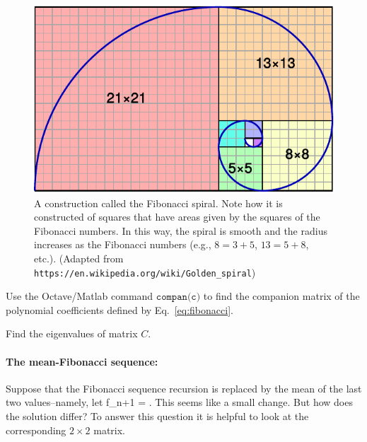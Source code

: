 \documentclass{ximera}
\begin{document}

\begin{figure}[ht]
\centering
\includegraphics[width=.3\textwidth]{EPS/FibonacciSpiral} 
A construction called the Fibonacci spiral. Note how it is constructed of squares
that have areas given by the squares of the Fibonacci numbers. In this way, the spiral is smooth and the
radius increases as the Fibonacci numbers (e.g., $8 = 3 + 5$, $13 = 5 + 8$, etc.).
(Adapted from \texttt{\scriptsize https://en.wikipedia.org/wiki/Golden\_spiral})
	
\end{figure}

\BEx %
Use the Octave/Matlab command $\texttt{compan(c)}$ to find the companion matrix of the polynomial
coefficients defined by Eq.~\ref{eq:fibonacci}. 

\EEx

\BEx %
Find the eigenvalues of matrix $C$.

\EEx

\paragraph{The mean-Fibonacci sequence:}
Suppose that the Fibonacci sequence recursion is replaced by the mean of the last two values--namely, let
\be
f_{n+1} = .
 \label{eq:avg}
\ee
This seems like a small change. But how does the solution differ?
To answer this question it is helpful to look at the corresponding $2\times 2$ matrix.
\end{document}
